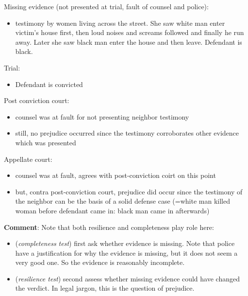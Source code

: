 \documentclass[
  10pt,
  dvipsnames,enabledeprecatedfontcommands]{scrartcl}
\providecommand{\tightlist}{%
  \setlength{\itemsep}{0pt}\setlength{\parskip}{0pt}}
\begin{document}
Missing evidence (not presented at trial, fault of counsel and police):

\begin{itemize}
\tightlist
\item
  testimony by women living across the street. She saw white man enter
  victim's house first, then loud noises and screams followed and
  finally he run away. Later she saw black man enter the house and then
  leave. Defendant is black.
\end{itemize}

Trial:

\begin{itemize}
\tightlist
\item
  Defendant is convicted
\end{itemize}

Post conviction court:

\begin{itemize}
\item
  counsel was at fault for not presenting neighbor testimony
\item
  still, no prejudice occurred since the testimony corroborates other
  evidence which was presented
\end{itemize}

Appellate court:

\begin{itemize}
\item
  counsel was at fault, agrees with post-conviction coirt on this point
\item
  but, contra post-conviction court, prejudice did occur since the
  testimony of the neighbor can be the basis of a solid defense case
  (=white man killed woman before defendant came in: black man came in
  afterwards)
\end{itemize}

\textbf{Comment}: Note that both resilience and completeness play role
here:

\begin{itemize}
\item
  (\emph{completeness test}) first ask whether evidence is missing. Note
  that police have a justification for why the evidence is missing, but
  it does not seem a very good one. So the evidence is reasonably
  incomplete.
\item
  (\emph{resilience test}) second assess whether missing evidence could
  have changed the verdict. In legal jargon, this is the question of
  prejudice.
\end{itemize}
\end{document}
